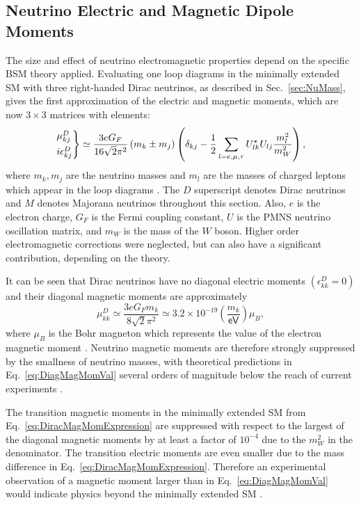 \subsection{Neutrino Electric and Magnetic Dipole Moments}
The size and effect of neutrino electromagnetic properties depend on the specific \gls{BSM} theory applied. Evaluating one loop diagrams in the minimally extended \gls{SM} with three right-handed Dirac neutrinos, as described in Sec.~\ref{sec:NuMass}, gives the first approximation of the electric and magnetic moments, which are now $3\times 3$ matrices with elements:
\begin{equation}\label{eq:DiracMagMomExpression}
\begin{rcases}
\mu^D_{kj}\\
i\epsilon^D_{kj}
\end{rcases}
\simeq\frac{3eG_F}{16\sqrt{2}\pi^2}\left(m_k\pm m_j\right)\left(\delta_{kj}-\frac{1}{2}\sum_{l=e,\mu ,\tau}U^{\star}_{lk}U_{lj}\frac{m_l^2}{m_W^2}\right),
\end{equation}
where $m_k,m_j$ are the neutrino masses and $m_l$ are the masses of charged leptons which appear in the loop diagrams \cite{nuElmagInt2015.pdf}. The $D$ superscript denotes Dirac neutrinos and $M$ denotes Majorana neutrinos throughout this section. Also, $e$ is the electron charge, $G_F$ is the Fermi coupling constant, $U$ is the \gls{PMNS} neutrino oscillation matrix, and $m_W$ is the mass of the $W$ boson. Higher order electromagnetic corrections were neglected, but can also have a significant contribution, depending on the theory.

It can be seen that Dirac neutrinos have no diagonal electric moments $\left(\epsilon_{kk}^D=0\right)$ and their diagonal magnetic moments are approximately
\begin{equation}\label{eq:DiagMagMomVal}
\mu_{kk}^D\simeq\frac{3eG_Fm_k}{8\sqrt{2}\pi^2}\simeq 3.2\times 10^{-19}\left(\frac{m_k}{\textsf{eV}}\right)\mu_B,
\end{equation}
where $\mu_B$ is the Bohr magneton which represents the value of the electron magnetic moment \cite{nuElmagInt2015.pdf}. Neutrino magnetic moments are therefore strongly suppressed by the smallness of neutrino masses, with theoretical predictions in Eq.~\ref{eq:DiagMagMomVal} several orders of magnitude below the reach of current experiments \cite{NeutrinoPropertiesSnowmass2022.pdf}.

The transition magnetic moments in the minimally extended \gls{SM} from Eq.~\ref{eq:DiracMagMomExpression} are suppressed with respect to the largest of the diagonal magnetic moments by at least a factor of $10^{-4}$ due to the $m_W^2$ in the denominator. The transition electric moments are even smaller due to the mass difference in Eq.~\ref{eq:DiracMagMomExpression}. Therefore an experimental observation of a magnetic moment larger than in Eq.~\ref{eq:DiagMagMomVal} would indicate physics beyond the minimally extended \gls{SM} \cite{nuElmagInt2015.pdf,nuMMMajoranaBounds2006.pdf}.

